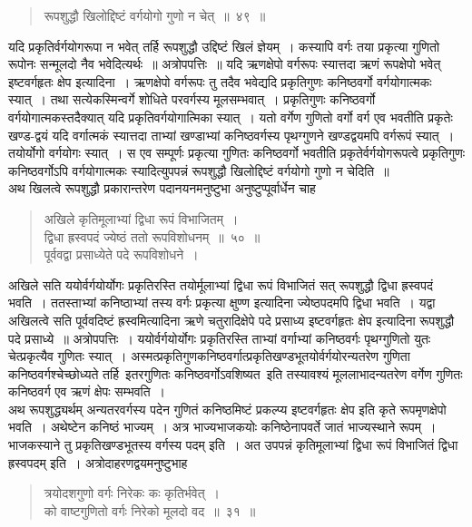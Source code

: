 \documentclass[11pt, openany]{book}
\begin{document}
\begin{quote}
    \bs
     रूपशुद्धौ खिलोद्दिष्टं वर्गयोगो गुणो न चेत्~॥~४९~॥~
\end{quote}

 यदि प्रकृतिर्वर्गयोगरूपा न भवेत् तर्हि रूपशुद्धौ उद्दिष्टं खिलं 
ज्ञेयम्~। कस्यापि वर्गः तया प्रकृत्या गुणितो रूपोनः सन्मूलदो नैव भवेदित्यर्थः~॥ अत्रोपपत्तिः~॥ यदि ऋणक्षेपो वर्गरूपः स्यात्तदा ऋणं रूपक्षेपो 
भवेत् इष्टवर्गहृतः क्षेप इत्यादिना~। ऋणक्षेपो वर्गरूपः तु तदैव भवेद्यदि
प्रकृतिगुणः कनिष्ठवर्गो वर्गयोगात्मकः स्यात्~। तथा सत्येकस्मिन्वर्गे शोधिते 
परवर्गस्य मूलसम्भवात्~। प्रकृतिगुणः कनिष्ठवर्गो वर्गयोगात्मकस्तदैक्यात् यदि 
प्रकृतिवर्गयोगात्मिका स्यात्~। यतो वर्गेण गुणितो वर्गो वर्ग एव भवतीति 
प्रकृतेः खण्ड-द्वयं यदि वर्गात्मकं स्यात्तदा ताभ्यां खण्डाभ्यां कनिष्ठवर्गस्य 
पृथग्गुणने खण्डद्वयमपि वर्गरूपं स्यात्~। तयोर्योगो वर्गयोगः स्यात्~। 
स एव सम्पूर्णः प्रकृत्या गुणितः कनिष्ठवर्गो भवतीति प्रकृतेर्वर्गयोगरूपत्वे 
प्रकृतिगुणः कनिष्ठवर्गोऽपि वर्गयोगात्मकः स्यादित्युपपन्नं रूपशुद्धौ खिलोद्दिष्टं वर्गयोगो गुणो न चेदिति~॥~\\

 \vspace{-3mm}
 अथ खिलत्वे रूपशुद्धौ प्रकारान्तरेण पदानयनमनुष्टुभा अनुष्टुप्पूर्वार्धेन चाह\textendash
\newpage
\begin{quote}
    \bs
     अखिले कृतिमूलाभ्यां द्विधा रूपं विभाजितम्~। \\
 द्विधा ह्रस्वपदं ज्येष्ठं ततो रूपविशोधनम्~॥~५०~॥~\\

\vspace{-5mm}
 पूर्ववद्वा प्रसाध्येते पदे रूपविशोधने~। 
\end{quote}

 अखिले सति ययोर्वर्गयोर्योगः प्रकृतिरस्ति तयोर्मूलाभ्यां द्विधा रूपं 
विभाजितं सत् रूपशुद्धौ द्विधा ह्रस्वपदं भवति~। ततस्ताभ्यां कनिष्ठाभ्यां
तस्य वर्गः प्रकृत्या क्षुण्ण इत्यादिना ज्येष्ठपदमपि द्विधा भवति~। यद्वा
अखिलत्वे सति पूर्ववदिष्टं ह्रस्वमित्यादिना ऋणे चतुरादिक्षेपे पदे प्रसाध्य 
इष्टवर्गहृतः क्षेप इत्यादिना रूपशुद्धौ पदे प्रसाध्ये~॥ अत्रोपपत्तिः~।
ययोर्वर्गयोर्योगः प्रकृतिरस्ति ताभ्यां वर्गाभ्यां कनिष्ठवर्गः पृथग्गुणितो 
युतः चेत्प्रकृत्यैव गुणितः स्यात्~।
अस्मत्प्रकृतिगुणकनिष्ठवर्गात्प्रकृतिखण्डभूतयोर्वर्गयोरन्यतरेण गुणिता \;कनिष्ठवर्गश्चेच्छोध्यते \;तर्हि \,इतरगुणितः \;कनिष्ठवर्गोऽवशिष्यत \,इति \;तस्यावश्यं मूललाभादन्यतरेण वर्गेण गुणितः कनिष्ठवर्ग एव ऋणं क्षेपः सम्भवति~। \\

\vspace{-3mm}
 अथ रूपशुद्ध्यर्थम् अन्यतरवर्गस्य पदेन गुणितं कनिष्ठमिष्टं 
प्रकल्प्य इष्टवर्गहृतः क्षेप इति कृते रूपमृणक्षेपो भवति~। अथेष्टेन कनिष्ठं 
भाज्यम्~। अत्र भाज्यभाजकयोः कनिष्ठेनापवर्ते जातं भाज्यस्थाने रूपम्~। 
भाजकस्याने तु प्रकृतिखण्डभूतस्य वर्गस्य पदम् इति~। अत उपपन्नं कृतिमूलाभ्यां द्विधा रूपं विभाजितं द्विधा ह्रस्वपदम् इति~। अत्रोदाहरणद्वयमनुष्टुभाह\textendash
\begin{quote}
    \ex
    त्रयोदशगुणो वर्गः निरेकः कः कृतिर्भवेत्~। \\
 को वाष्टगुणितो वर्गः निरेको मूलदो वद~॥~३१~॥~
\end{quote}
 
\end{document}
